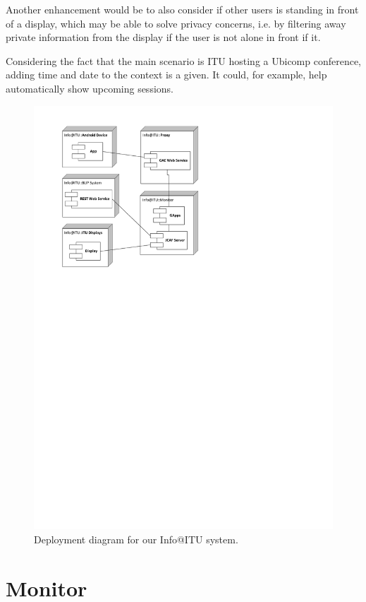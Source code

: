 \documentclass{ubicomp2011}
\begin{document}
Another enhancement would be to also consider if other users is standing in front of a display, which may be able to solve privacy concerns, i.e. by filtering away private information from the display if the user is not alone in front if it.

Considering the fact that the main scenario is ITU hosting a Ubicomp conference, adding time and date to the context is a given. It could, for example, help automatically show upcoming sessions.

\begin{figure}[t]
\begin{center}
\includegraphics[width=0.90\columnwidth]{deployment-diagram.pdf}
\end{center}
\caption{Deployment diagram for our Info@ITU system.}
\label{fig:deployment-diagram}
\end{figure}

\section{Monitor}
\end{document}
